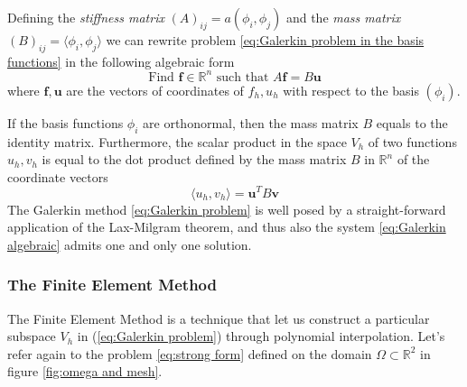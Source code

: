 Defining the \textit{stiffness matrix} $(A)_{ij} = a(\phi_i, \phi_j)$ and the \textit{mass matrix} $(B)_{ij} = \langle \phi_i, \phi_j\rangle$ we can rewrite problem \ref{eq:Galerkin problem in the basis functions} in the following algebraic form
\begin{equation}\label{eq:Galerkin algebraic}
\text{Find }\mathbf f\in\mathbb R^n\text{ such that } A\mathbf f = B \mathbf u
\end{equation}
where $\mathbf f, \mathbf u$ are the vectors of coordinates of $f_h, u_h$ with respect to the basis $(\phi_i)$. 
\vspace{0.5cm}
\begin{remark}
	 If the basis functions $\phi_i$ are orthonormal, then the mass matrix $B$ equals to the identity matrix. Furthermore, the scalar product in the space $V_h$ of two functions $u_h, v_h$ is equal to the dot product defined by the mass matrix $B$ in $\mathbb R^n$ of the coordinate vectors
	\begin{equation}\label{eq:dot product}
	\langle u_h, v_h\rangle = \mathbf u^T B \mathbf v
	\end{equation}
	The Galerkin method \ref{eq:Galerkin problem} is well posed by a straight-forward application of the Lax-Milgram theorem, and thus also the system \ref{eq:Galerkin algebraic} admits one and only one solution.
\end{remark}

 \subsubsection{The Finite Element Method}
 
  The Finite Element Method is a technique that let us construct a particular subspace $V_h$ in (\ref{eq:Galerkin problem}) through polynomial interpolation. Let's refer again to the problem \ref{eq:strong form} defined on the domain $\Omega\subset\mathbb R^2$ in figure \ref{fig:omega and mesh}. 
